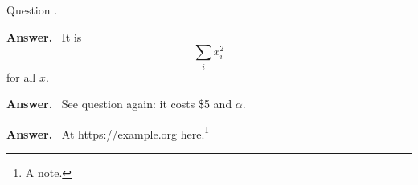\documentclass{article}
\newcounter{q}
\newenvironment{answer}{\par\noindent\textbf{Answer.}\ }{\par}
\begin{document}
Question \theq.
\begin{answer}
It is \[ \sum_i x_i^2 \] for all $x$.
\end{answer}
\begin{answer}
See question \theq{} again: it costs \$5 and $\alpha$.
\end{answer}
\begin{answer}
At \url{https://example.org} here.\footnote{A note.}
\end{answer}
\end{document}
